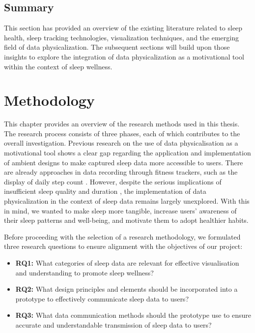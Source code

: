 \documentclass[
  a4paper,  %
  twoside,  %
  bibliography=totoc,
  headsepline,
  cleardoublepage=empty,
  parskip=half,
  draft=false
]{scrbook}
\begin{document}
\section{Summary}
This section has provided an overview of the existing literature related to sleep health, sleep tracking technologies, visualization techniques, and the emerging field of data physicalization. The subsequent sections will build upon those insights to explore the integration of data physicalization as a motivational tool within the context of sleep wellness.


\chapter{Methodology}

This chapter provides an overview of the research methods used in this thesis. The research process consists of three phases, each of which contributes to the overall investigation. Previous research on the use of data physicalisation as a motivational tool shows a clear gap regarding the application and implementation of ambient designs to make captured sleep data more accessible to users.
There are already approaches in data recording through fitness trackers, such as the display of daily step count \cite{LOOP}. However, despite the serious implications of insufficient sleep quality and duration \cite{Sleep_Health_Society}, the implementation of data physicalization in the context of sleep data remains largely unexplored. With this in mind, we wanted to make sleep more tangible, increase users' awareness of their sleep patterns and well-being, and motivate them to adopt healthier habits.

Before proceeding with the selection of a research methodology, we formulated three research questions to ensure alignment with the objectives of our project:

\begin{itemize}
    \item \textbf{RQ1:} What categories of sleep data are relevant for effective visualisation and understanding to promote sleep wellness?
    \item \textbf{RQ2:} What design principles and elements should be incorporated into a prototype to effectively communicate sleep data to users?
    \item \textbf{RQ3:} What data communication methods should the prototype use to ensure accurate and understandable transmission of sleep data to users?
\end{itemize}
\end{document}
